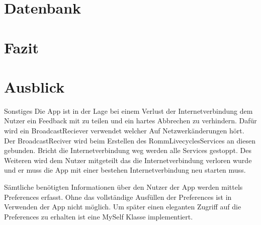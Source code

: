 \section{Datenbank}
\label{sec:Datenbank}
\section{Fazit}
\label{sec:Fazit}
\section{Ausblick}
\label{sec:Ausblick}
Sonstiges
Die App ist in der Lage bei einem Verlust der Internetverbindung dem Nutzer ein Feedback mit zu teilen und ein hartes Abbrechen zu verhindern. Dafür wird ein BroadcastReciever verwendet welcher Auf Netzwerkänderungen hört. Der BroadcastReciver wird beim Erstellen des RommLivecyclesServices an diesen gebunden. Bricht die Internetverbindung weg werden alle Services gestoppt. Des Weiteren wird dem Nutzer mitgeteilt das die Internetverbindung verloren wurde und er muss die App mit einer bestehen Internetverbindung neu starten muss.

Sämtliche benötigten Informationen über den Nutzer der App werden mittels Preferences erfasst. Ohne das vollständige Ausfüllen der Preferences ist in Verwenden der App nicht möglich. Um später einen eleganten Zugriff auf die Preferences zu erhalten ist eine MySelf Klasse implementiert.

